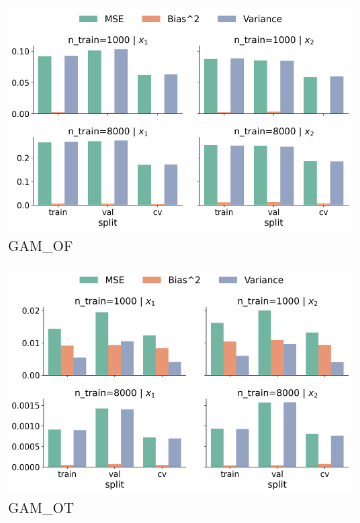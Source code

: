 \documentclass[runningheads]{llncs}
\begin{document}
\begin{figure}[ht!]
    \centering
    \begin{subfigure}[b]{0.49\textwidth}
        \includegraphics[width=\textwidth]{img/SNC/feature_effect_errors_pdp_GAM_OF.png}
        \caption{GAM\_OF}
        \label{fig:pdp-results-snc-gam-of}  %
    \end{subfigure}
    \hfill
    \begin{subfigure}[b]{0.49\textwidth}
        \includegraphics[width=\textwidth]{img/SNC/feature_effect_errors_pdp_GAM_OT.png}
        \caption{GAM\_OT}
        \label{fig:pdp-results-snc-gam-ot}  %
    \end{subfigure}
    \\[10pt]
    \vfill
    \begin{subfigure}[b]{0.49\textwidth}

\end{subfigure}
\end{figure}
\end{document}
